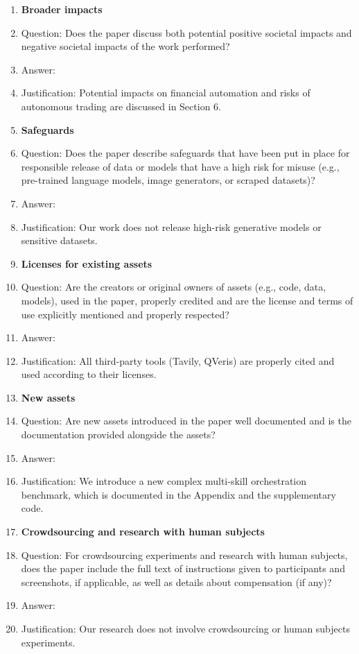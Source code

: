 \begin{enumerate}
\item {\bf Broader impacts}
    \item[] Question: Does the paper discuss both potential positive societal impacts and negative societal impacts of the work performed?
    \item[] Answer: \answerYes{} 
    \item[] Justification: Potential impacts on financial automation and risks of autonomous trading are discussed in Section 6.
    
\item {\bf Safeguards}
    \item[] Question: Does the paper describe safeguards that have been put in place for responsible release of data or models that have a high risk for misuse (e.g., pre-trained language models, image generators, or scraped datasets)?
    \item[] Answer: \answerNA{} 
    \item[] Justification: Our work does not release high-risk generative models or sensitive datasets.

\item {\bf Licenses for existing assets}
    \item[] Question: Are the creators or original owners of assets (e.g., code, data, models), used in the paper, properly credited and are the license and terms of use explicitly mentioned and properly respected?
    \item[] Answer: \answerYes{} 
    \item[] Justification: All third-party tools (Tavily, QVeris) are properly cited and used according to their licenses.

\item {\bf New assets}
    \item[] Question: Are new assets introduced in the paper well documented and is the documentation provided alongside the assets?
    \item[] Answer: \answerYes{} 
    \item[] Justification: We introduce a new complex multi-skill orchestration benchmark, which is documented in the Appendix and the supplementary code.

\item {\bf Crowdsourcing and research with human subjects}
    \item[] Question: For crowdsourcing experiments and research with human subjects, does the paper include the full text of instructions given to participants and screenshots, if applicable, as well as details about compensation (if any)? 
    \item[] Answer: \answerNA{} 
    \item[] Justification: Our research does not involve crowdsourcing or human subjects experiments.


\end{enumerate}
